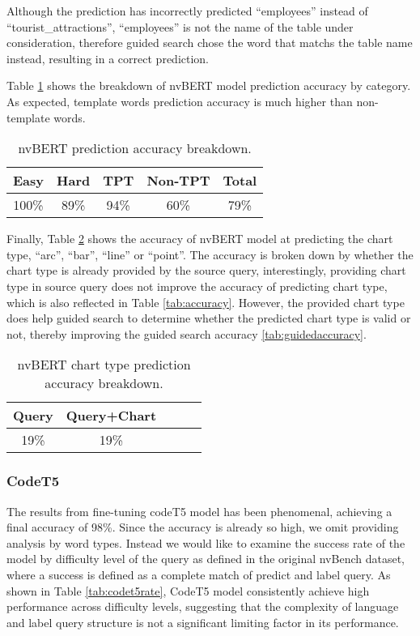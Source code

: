 \documentclass[
	a4paper, %
	10pt, %
	unnumberedsections, %
	twoside, %
]{t0003}
\begin{document}
Although the prediction has incorrectly predicted ``employees'' instead of ``tourist\_attractions'', ``employees'' is not the name of the table under consideration, therefore guided search chose the word that matchs the table name instead, resulting in a correct prediction.

Table \ref{tab:accuracybreakdown} shows the breakdown of nvBERT model prediction accuracy by category. As expected, template words prediction accuracy is much higher than non-template words.  

\begin{table}
	\caption{nvBERT prediction accuracy breakdown.}
	\centering
	\begin{tabular}{ccccc }
		\toprule
		Easy & Hard & TPT & Non-TPT & Total  \\
		\midrule
		100\% & 89\% & 94\% & 60\% & 79\% \\
		\bottomrule
	\end{tabular}
	\label{tab:accuracybreakdown}
\end{table}

Finally, Table \ref{tab:chartaccuracy} shows the accuracy of nvBERT model at predicting the chart type, ``arc'', ``bar'', ``line'' or ``point''. The accuracy is broken down by whether the chart type is already provided by the source query, interestingly, providing chart type in source query does not improve the accuracy of predicting chart type, which is also reflected in Table \ref{tab:accuracy}. However, the provided chart type does help guided search to determine whether the predicted chart type is valid or not, thereby improving the guided search accuracy \ref{tab:guidedaccuracy}.

\begin{table}
	\caption{nvBERT chart type prediction accuracy breakdown.}
	\centering
	\begin{tabular}{ccccc}
		\toprule
		Query & Query+Chart  \\
		\midrule
		19\% & 19\% \\
		\bottomrule
	\end{tabular}
	\label{tab:chartaccuracy}
\end{table}

\subsubsection{CodeT5} The results from fine-tuning codeT5 model has been phenomenal, achieving a final accuracy of 98\%. Since the accuracy is already so high, we omit providing analysis by word types. Instead we would like to examine the success rate of the model by difficulty level of the query as defined in the original nvBench dataset, where a success is defined as a complete match of predict and label query. As shown in Table \ref{tab:codet5rate}, CodeT5 model consistently achieve high performance across difficulty levels, suggesting that the complexity of language and label query structure is not a significant limiting factor in its performance.
\end{document}
